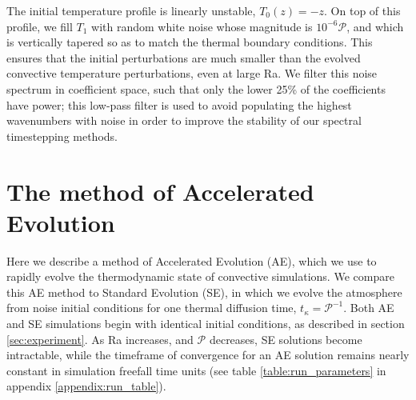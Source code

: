 \documentclass[aps, pre, onecolumn, nofootinbib, notitlepage, groupedaddress, amsfonts, amssymb, amsmath, longbibliography]{revtex4-1}
\begin{document}
The initial temperature profile is linearly unstable,
$T_0(z) = -z$. On top of this profile, we fill $T_1$ with
random white noise whose magnitude is $10^{-6}\mathcal{P}$, and which is
vertically tapered so as to match the thermal boundary conditions.
This ensures that the initial perturbations are much smaller than the
evolved convective temperature perturbations, even at large Ra.
We filter this noise spectrum in coefficient space, 
such that only the lower 25\% of the coefficients
have power; this low-pass filter is used to avoid populating the
highest wavenumbers with noise in order to improve the stability of our
spectral timestepping methods.



\section{The method of Accelerated Evolution}
\label{sec:ae}
Here we describe a method of Accelerated Evolution (AE), which we use 
to rapidly evolve the thermodynamic state of convective simulations.  
We compare this AE method to Standard Evolution
(SE), in which we evolve the atmosphere from noise initial conditions
for one thermal diffusion time,
$t_\kappa = \mathcal{P}^{-1}$. Both AE and SE simulations begin with identical
initial conditions, as described in section \ref{sec:experiment}.
As Ra increases, and $\mathcal{P}$ decreases, SE solutions become intractable, 
while the timeframe of convergence for an AE solution remains nearly constant
in simulation freefall time units (see table \ref{table:run_parameters} in
appendix \ref{appendix:run_table}).
\end{document}
